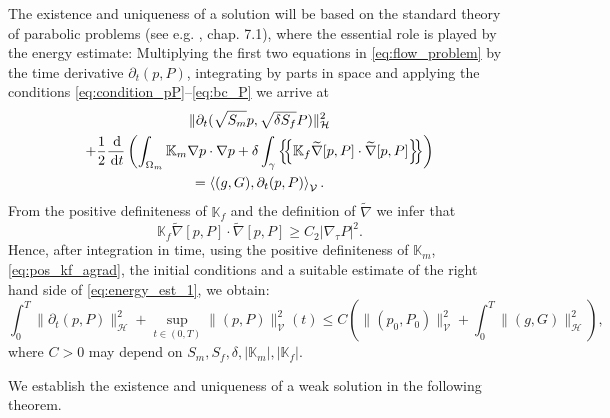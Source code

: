 \documentclass[a4paper]{article}
\def\agrad{\widetilde\nabla}
\def\avg#1{\left\{\mskip-5mu\left\{#1\right\}\mskip-5mu\right\}}
\def\d {\,{\rm d}}
\def\ddt#1{\frac{\d #1}{\d t}}
\def\dt{\prtl_t}
\def\dual#1#2{\left\langle #1,#2\right\rangle}
\def\Hf{\mathcal H}
\def\norm#1{\|#1\|}
\def\prtl{\partial}
\def\tn#1{{\mathbb{#1}}}    %
\def\Vf{{\mathcal V}} %
\newcommand{\eq}[1]{\begin{equation}#1\end{equation}}
\newcommand{\ml}[1]{\begin{multline}#1\end{multline}}
\begin{document}
The existence and uniqueness of a solution will be based on the standard theory of parabolic problems (see e.g. \cite{evans_pde}, chap. 7.1), where the essential role is played by the energy estimate:
Multiplying the first two equations in \eqref{eq:flow_problem} by the time derivative $\dt(p,P)$, integrating by parts in space and applying the conditions \eqref{eq:condition_pP}--\eqref{eq:bc_P} we arrive at
\ml{\label{eq:energy_est_1} \norm{\dt(\sqrt{S_m} p,\sqrt{\delta S_f} P)}_\Hf^2\\
+ \frac12\ddt{}\left(\int_{\Omega_m}\tn K_m\nabla p\cdot\nabla p
+ \delta\int_\gamma\avg{\tn K_f\agrad[p,P]\cdot\agrad[p,P]}\right)\\
= \dual{(g,G)}{\dt(p,P)}_\Vf. }
From the positive definiteness of $\tn K_f$ and the definition of $\agrad$ we infer that
\eq{ \label{eq:pos_kf_agrad} \tn K_f\agrad[p,P]\cdot\agrad[p,P] \ge C_2|\nabla_\tau P|^2. }
Hence, after integration in time, using the positive definiteness of $\tn K_m$, \eqref{eq:pos_kf_agrad}, the initial conditions and a suitable estimate of the right hand side of \eqref{eq:energy_est_1}, we obtain:
\eq{ \label{eq:energy_est_flow} \int_0^T\norm{\dt(p,P)}_\Hf^2 + \sup_{t\in(0,T)}\norm{(p,P)}_\Vf^2(t) \le C\left(\norm{(p_0,P_0)}_\Vf^2 + \int_0^T\norm{(g,G)}_{\Hf}^2\right), }
where $C>0$ may depend on $S_m,S_f,\delta,|\tn K_m|,|\tn K_f|$.

We establish the existence and uniqueness of a weak solution in the following theorem.
\end{document}
